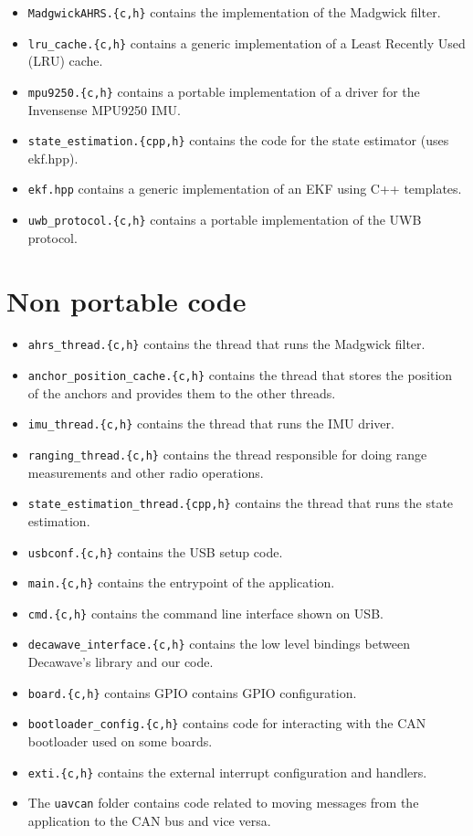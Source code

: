 \begin{itemize}
\tightlist
\item
  \texttt{MadgwickAHRS.\{c,h\}} contains the implementation of the
  Madgwick filter.
\item
  \texttt{lru\_cache.\{c,h\}} contains a generic implementation of a
  Least Recently Used (LRU) cache.
\item
  \texttt{mpu9250.\{c,h\}} contains a portable implementation of a
  driver for the Invensense MPU9250 IMU.
\item
  \texttt{state\_estimation.\{cpp,h\}} contains the code for the state
  estimator (uses ekf.hpp).
\item
  \texttt{ekf.hpp} contains a generic implementation of an EKF using C++
  templates.
\item
  \texttt{uwb\_protocol.\{c,h\}} contains a portable implementation of
  the UWB protocol.
\end{itemize}

\section*{Non portable code}\label{non-portable-code}

\begin{itemize}
\tightlist
\item
  \texttt{ahrs\_thread.\{c,h\}} contains the thread that runs the
  Madgwick filter.
\item
  \texttt{anchor\_position\_cache.\{c,h\}} contains the thread that
  stores the position of the anchors and provides them to the other
  threads.
\item
  \texttt{imu\_thread.\{c,h\}} contains the thread that runs the IMU
  driver.
\item
  \texttt{ranging\_thread.\{c,h\}} contains the thread responsible for
  doing range measurements and other radio operations.
\item
  \texttt{state\_estimation\_thread.\{cpp,h\}} contains the thread that
  runs the state estimation.
\item
  \texttt{usbconf.\{c,h\}} contains the USB setup code.
\item
  \texttt{main.\{c,h\}} contains the entrypoint of the application.
\item
  \texttt{cmd.\{c,h\}} contains the command line interface shown on USB.
\item
  \texttt{decawave\_interface.\{c,h\}} contains the low level bindings
  between Decawave's library and our code.
\item
  \texttt{board.\{c,h\}} contains GPIO contains GPIO configuration.
\item
  \texttt{bootloader\_config.\{c,h\}} contains code for interacting with
  the CAN bootloader used on some boards.
\item
  \texttt{exti.\{c,h\}} contains the external interrupt configuration
  and handlers.
\item
  The \texttt{uavcan} folder contains code related to moving messages
  from the application to the CAN bus and vice versa.
\end{itemize}

